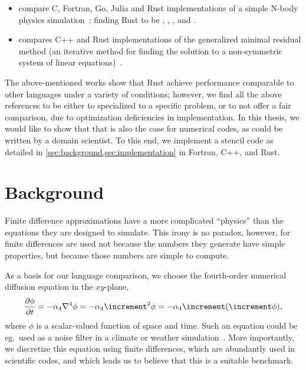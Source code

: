 \documentclass[british]{scrreprt}
\renewcommand\laplacian{\increment}
\begin{document}
\begin{itemize}
	\item {} compare C, Fortran, Go, Julia and Rust implementations of a simple N-body physics simulation~\cite{Blanco-CuaresmaWhatcanprogramming2016, Blanco-Cuaresmamarblestationbenchmarkleapfrog2018}; finding Rust to be , , , and .
	\item {} compares C++ and Rust implementations of the generalized minimal residual method (an iterative method for finding the solution to a non-symmetric system of linear equations)~\cite{AtchesonRustFloatingpointIntensive2019}.
\end{itemize}

The above-mentioned works show that Rust achieve performance comparable to other languages under a variety of conditions; however, we find all the above references to be either to specialized to a specific problem, or to not offer a fair comparison, due to optimization deficiencies in implementation. In this thesis, we would like to show that that is also the case for numerical codes, as could be written by a domain scientist. To this end, we implement a stencil code as detailed in \cref{sec:background,sec:implementation} in Fortran, C++, and Rust.


\section{Background}
\label{sec:background}
\begin{displayquote}
	Finite difference approximations have a more complicated \enquote{physics} than the equations they are designed to simulate. This irony is no paradox, however, for finite differences are used not because the numbers they generate have simple properties, but because those numbers are simple to compute.
\end{displayquote}

As a basis for our language comparison, we choose the fourth-order numerical diffusion equation in the \( xy \)-plane,
\begin{equation}
	\pdv{\phi}{t} =
		-\alpha_{4} \nabla^{4} \phi =
		-\alpha_{4} \laplacian^{2} \phi =
		-\alpha_{4} \laplacian (\laplacian \phi), \label{eq:4th-order-diffusion}
\end{equation}
where \( \phi \) is a scalar-valued function of space and time. Such an equation could be eg.\ used as a noise filter in a climate or weather simulation~\cite{XueHighordermonotonicnumerical2000}. More importantly, we discretize this equation using finite differences, which are abundantly used in scientific codes, and which leads us to believe that this is a suitable benchmark.
\end{document}

